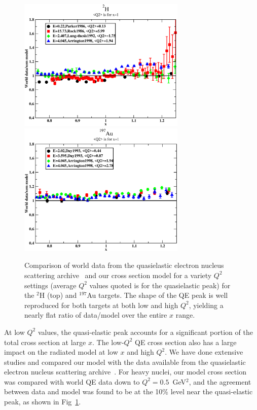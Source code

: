 \begin{figure}[htbp]
\begin{center}
\includegraphics[width=80mm, angle=0]{plots/ld2_worldDM.eps}
\includegraphics[width=80mm, angle=0]{plots/au_worldDM.eps}
\caption{Comparison of world data from the
quasielastic electron nucleus scattering archive~\cite{Benhar:qe_archive} and
our cross section model for a variety $Q^2$ settings (average $Q^2$ values
quoted is for the quasielastic peak) for the $^2$H (top) and $^{197}$Au
targets. The shape of the QE peak is well reproduced for both targets
at both low and high $Q^2$, yielding a nearly flat ratio of data/model over
the entire $x$ range.
\label{all_worlddata_compare_fig}}
\end{center}
\end{figure}


At low $Q^2$ values, the quasi-elastic peak accounts for a significant portion
of the total cross section at large $x$.  The low-$Q^2$ QE cross section also
has a large impact on the radiated model at low $x$ and high $Q^2$. We have
done extensive studies and compared our model with the data available from the
quasielastic electron nucleus scattering archive~\cite{Benhar:qe_archive}. For
heavy nuclei, our model cross section was compared with world QE
data down to $Q^2=0.5$~GeV$^2$, and the agreement between data and model was
found to be at the 10\% level near the quasi-elastic peak, as shown in
Fig~\ref{all_worlddata_compare_fig}.


